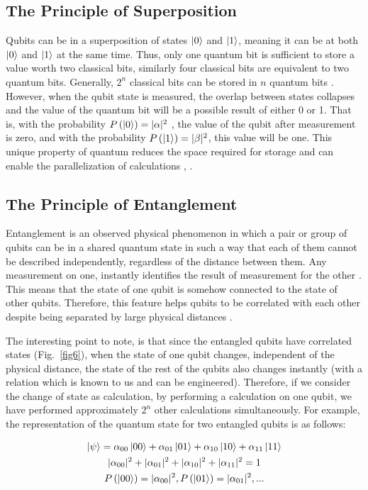 \documentclass[conference]{IEEEtran}
\begin{document}
\subsection{The Principle of Superposition}
Qubits can be in a superposition of states $\ket{0}$ and $\ket{1}$, meaning it can be at both  $\ket{0}$ and $\ket{1}$ at the same time. Thus, only one quantum bit is sufficient to store a value worth two classical bits, similarly four classical bits are equivalent to two quantum bits. Generally, $2^{n}$ classical bits can be stored in $n$ quantum bits \cite{b19}. However, when the qubit state is measured, the overlap between states collapses and the value of the quantum bit will be a possible result of either 0 or 1. That is, with the probability $P\left(\ket{0}\right) = |\alpha|^{2}$  , the value of the qubit after measurement is zero, and with the probability $P\left(\ket{1}\right) = |\beta|^{2}$, this value will be one. This unique property of quantum reduces the space required for storage and can enable the parallelization of calculations \cite{b15}, \cite{b19}.

\subsection{The Principle of Entanglement}
Entanglement is an observed physical phenomenon in which a pair or group of qubits can be in a shared quantum state in such a way that each of them cannot be described independently, regardless of the distance between them. Any measurement on one, instantly identifies the result of measurement for the other \cite{b15}. This means that the state of one qubit is somehow connected to the state of other qubits. Therefore, this feature helps qubits to be correlated with each other despite being separated by large physical distances \cite{b19}.

The interesting point to note, is that since the entangled qubits have correlated states (Fig.~\ref{fig6}), when the state of one qubit changes, independent of the physical distance, the state of the rest of the qubits also changes instantly (with a relation which is known to us and can be engineered). Therefore, if we consider the change of state as calculation, by performing a calculation on one qubit, we have performed approximately $2^{n}$ other calculations simultaneously. For example, the representation of the quantum state for two entangled qubits is as follows:

\begin{gather}
	\ket{\psi} = \alpha_{00} \ket{00} + \alpha_{01} \ket{01} + \alpha_{10} \ket{10} + \alpha_{11} \ket{11} \\
	|\alpha_{00}|^{2} + |\alpha_{01}|^{2} + |\alpha_{10}|^{2} + |\alpha_{11}|^{2} = 1 \\
	P\left(\ket{00}\right) = |\alpha_{00}|^{2}, P\left(\ket{01}\right) = |\alpha_{01}|^{2}, ...
	\label{eq11}
\end{gather}
\end{document}
